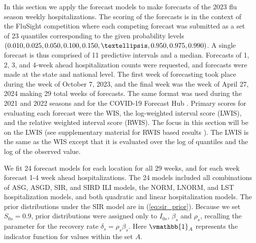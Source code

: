 In this section we apply the forecast models to make forecasts of the 2023 
flu season weekly hospitalizations. The scoring of the forecasts is in the 
context of the FluSight competition where each competing forecast was 
submitted as a set of 23 quantiles corresponding to the given probability 
levels $(0.010, 0.025, 0.050, 0.100, 0.150, …, 0.950, 0.975,\\ 0.990)$. A 
single forecast is thus comprised of 11 predictive intervals and a median.
Forecasts of 1, 2, 3, and 4-week ahead hospitalization counts were requested, 
and forecasts were made at the state and national level. The first week of 
forecasting took place during the week of October 7, 2023, and the final week 
was the week of April 27, 2024 making 29 total weeks of forecasts.
 The same format was used during the 2021 and 2022 seasons and for the 
 COVID-19 Forecast Hub \cite[]{mathis2024evaluation, bracher2021evaluating}. 
 Primary scores for evaluating each forecast were the WIS, 
 the log-weighted interval score (LWIS), and the relative weighted 
 interval score (RWIS). The focus in this section will be on the LWIS 
 (see supplementary material for RWIS based results \cite[]{wadsworth2024bas}).
 The LWIS is the same as the WIS except that it is evaluated 
over the log of quantiles and the log of the observed value.




We fit 24 forecast models for each location for all 29 weeks, and for each 
week forecast 1-4 week ahead hospitalizations. The 24 models included all 
combinations of ASG, ASGD, SIR, and SIRD ILI models, the NORM, LNORM, and LST 
hospitalization models, and both quadratic and linear hospitalization models. 
The prior distributions under the SIR model are in (\ref{eq:sir_prior}). 
Because we set $S_{0s} = 0.9$, prior distributions were assigned only to 
$I_{0s}$, $\beta_s$ and $\rho_s$, recalling the parameter for the recovery 
rate $\delta_s = \rho_s \beta_s$. Here $\vmathbb{1}_{A}$ represents the 
indicator function for values within the set $A$.

